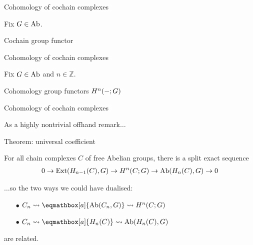 \begin{frame}[t]{Cohomology of cochain complexes} %

  \par Fix $G \in \mathrm{Ab}$.
  \par{} Cochain group functor
  
\end{frame}

\begin{frame}[t]{Cohomology of cochain complexes} %

  \par Fix $G \in \mathrm{Ab}$ and $n \in \mathbb{Z}$.
  \par{} Cohomology group functors $H^n ({-} ; G)$
  
\end{frame}

\begin{frame}{Cohomology of cochain complexes} %

  \par As a highly nontrivial offhand remark$\dots$

  \begin{block}{Theorem: universal coefficient \cite[Theorem~3.2]{hatcher}}
    \par For all chain complexes $C$ of free Abelian groups, there is a split exact sequence
    \vspace{-0.5 \baselineskip}
    \begin{align*}
      0
      \to \operatorname{Ext} (H_{n - 1} (C), G)
      \to H^n (C ; G)
      \to \mathrm{Ab} (H_n (C), G)
      \to 0
    \end{align*}
  \end{block}
  \par $\dots$so the two ways we could have dualised:
  \begin{itemize}[nosep]
    \item[$\bullet$] $C_n \rightsquigarrow \eqmathbox[a]{\Ab(C_n, G)} \rightsquigarrow H^n (C; G)$
    \item[$\bullet$] $C_n \rightsquigarrow \eqmathbox[a]{H_n (C)} \rightsquigarrow \Ab (H_n (C), G)$
  \end{itemize}
  are related.
  
\end{frame}
